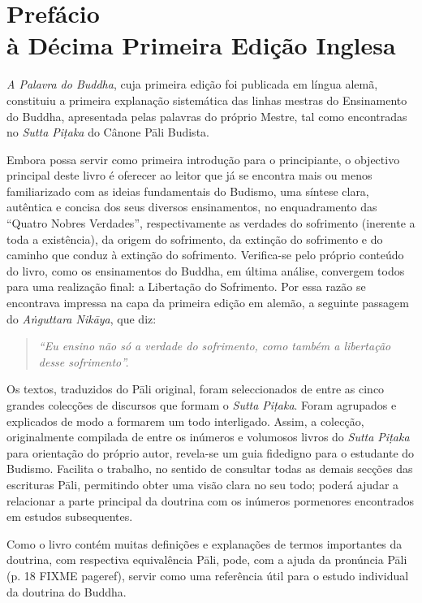\chapter[Prefácio à Décima Primeira Edição Inglesa]{Prefácio\\ à Décima Primeira Edição Inglesa}

\emph{A Palavra do Buddha}, cuja primeira edição foi publicada em língua alemã,
constituiu a primeira explanação sistemática das linhas mestras do Ensinamento
do Buddha, apresentada pelas palavras do próprio Mestre, tal como encontradas no
\emph{Sutta Piṭaka} do Cânone Pāli Budista.

Embora possa servir como primeira introdução para o principiante, o objectivo
principal deste livro é oferecer ao leitor que já se encontra mais ou menos
familiarizado com as ideias fundamentais do Budismo, uma síntese clara,
autêntica e concisa dos seus diversos ensinamentos, no enquadramento das
``Quatro Nobres Verdades'', respectivamente as verdades do sofrimento (inerente
a toda a existência), da origem do sofrimento, da extinção do sofrimento e do
caminho que conduz à extinção do sofrimento. Verifica-se pelo próprio conteúdo
do livro, como os ensinamentos do Buddha, em última análise, convergem todos
para uma realização final: a Libertação do Sofrimento. Por essa razão se
encontrava impressa na capa da primeira edição em alemão, a seguinte passagem do
\emph{Aṅguttara Nikāya}, que diz:

\begin{verse}
  \emph{``Eu ensino não só a verdade do sofrimento, como também a libertação
    desse sofrimento''.}
\end{verse}

Os textos, traduzidos do Pāli original, foram seleccionados de entre as cinco
grandes colecções de discursos que formam o \emph{Sutta Piṭaka}. Foram agrupados
e explicados de modo a formarem um todo interligado. Assim, a colecção,
originalmente compilada de entre os inúmeros e volumosos livros do \emph{Sutta
  Piṭaka} para orientação do próprio autor, revela-se um guia fidedigno para o
estudante do Budismo. Facilita o trabalho, no sentido de consultar todas as
demais secções das escrituras Pāli, permitindo obter uma visão clara no seu
todo; poderá ajudar a relacionar a parte principal da doutrina com os inúmeros
pormenores encontrados em estudos subsequentes.

Como o livro contém muitas definições e explanações de termos importantes da
doutrina, com respectiva equivalência Pāli, pode, com a ajuda da pronúncia Pāli
(p. 18 FIXME pageref), servir como uma referência útil para o estudo individual
da doutrina do Buddha.

